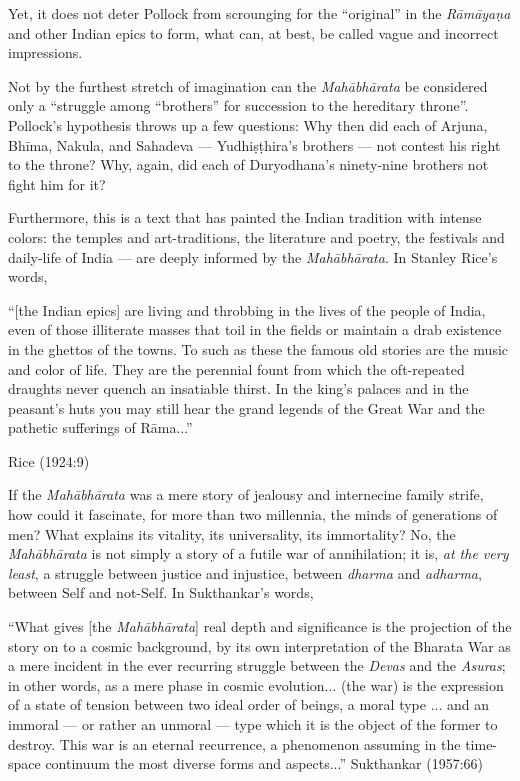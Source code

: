 Yet, it does not deter Pollock from scrounging for the “original” in the {\sl Rāmāyaṇa} and other Indian epics to form, what can, at best, be called vague and incorrect impressions. 

Not by the furthest stretch of imagination can the {\sl Mahābhārata} be considered only a “struggle among “brothers” for succession to the hereditary throne”. Pollock’s hypothesis throws up a few questions: Why then did each of Arjuna, Bhīma, Nakula, and Sahadeva --- Yudhiṣṭhira’s brothers --- not contest his right to the throne? Why, again, did each of Duryodhana’s ninety-nine brothers not fight him for it? 

Furthermore, this is a text that has painted the Indian tradition with intense colors: the temples and art-traditions, the literature and poetry, the festivals and daily-life of India --- are deeply informed by the {\sl Mahābhārata}. In Stanley Rice’s words,

\begin{myquote}
“[the Indian epics] are living and throbbing in the lives of the people of India, even of those illiterate masses that toil in the fields or maintain a drab existence in the ghettos of the towns. To such as these the famous old stories are the music and color of life. They are the perennial fount from which the oft-repeated draughts never quench an insatiable thirst. In the king's palaces and in the peasant's huts you may still hear the grand legends of the Great War and the pathetic sufferings of Rāma...”

\hfill Rice (1924:9)
\end{myquote}

If the {\sl Mahābhārata} was a mere story of jealousy and internecine family strife, how could it fascinate, for more than two millennia, the minds of generations of men? What explains its vitality, its universality, its immortality? No, the {\sl Mahābhārata} is not simply a story of a futile war of annihilation; it is, {\sl at the very least}, a struggle between justice and injustice, between {\sl dharma} and {\sl adharma}, between Self and not-Self. In Sukthankar’s words,

\begin{myquote}
“What gives [the {\sl Mahābhārata}] real depth and significance is the projection of the story on to a cosmic background, by its own interpretation of the Bharata War as a mere incident in the ever recurring struggle between the {\sl Devas} and the {\sl Asuras}; in other words, as a mere phase in cosmic evolution... (the war) is the expression of a state of tension between two ideal order of beings, a moral type ...  and an immoral --- or rather an unmoral --- type which it is the object of the former to destroy. This war is an eternal recurrence, a phenomenon assuming in the time-space continuum the most diverse forms and aspects...” 
\hfill Sukthankar (1957:66)
\end{myquote}


